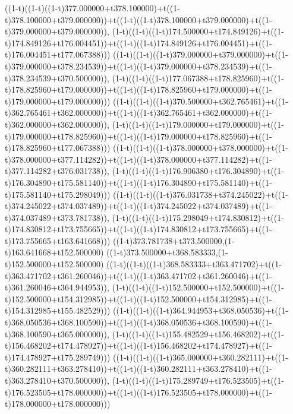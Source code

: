 ((1-t)((1-t)((1-t)377.000000+t378.100000)+t((1-t)378.100000+t379.000000))+t((1-t)((1-t)378.100000+t379.000000)+t((1-t)379.000000+t379.000000)),                                     (1-t)((1-t)((1-t)174.500000+t174.849126)+t((1-t)174.849126+t176.004451))+t((1-t)((1-t)174.849126+t176.004451)+t((1-t)176.004451+t177.067388)))
((1-t)((1-t)((1-t)379.000000+t379.000000)+t((1-t)379.000000+t378.234539))+t((1-t)((1-t)379.000000+t378.234539)+t((1-t)378.234539+t370.500000)),                                     (1-t)((1-t)((1-t)177.067388+t178.825960)+t((1-t)178.825960+t179.000000))+t((1-t)((1-t)178.825960+t179.000000)+t((1-t)179.000000+t179.000000)))
((1-t)((1-t)((1-t)370.500000+t362.765461)+t((1-t)362.765461+t362.000000))+t((1-t)((1-t)362.765461+t362.000000)+t((1-t)362.000000+t362.000000)),                                     (1-t)((1-t)((1-t)179.000000+t179.000000)+t((1-t)179.000000+t178.825960))+t((1-t)((1-t)179.000000+t178.825960)+t((1-t)178.825960+t177.067388)))
((1-t)((1-t)((1-t)378.000000+t378.000000)+t((1-t)378.000000+t377.114282))+t((1-t)((1-t)378.000000+t377.114282)+t((1-t)377.114282+t376.031738)),                                     (1-t)((1-t)((1-t)176.906380+t176.304890)+t((1-t)176.304890+t175.581140))+t((1-t)((1-t)176.304890+t175.581140)+t((1-t)175.581140+t175.298049)))
((1-t)((1-t)((1-t)376.031738+t374.245022)+t((1-t)374.245022+t374.037489))+t((1-t)((1-t)374.245022+t374.037489)+t((1-t)374.037489+t373.781738)),                                     (1-t)((1-t)((1-t)175.298049+t174.830812)+t((1-t)174.830812+t173.755665))+t((1-t)((1-t)174.830812+t173.755665)+t((1-t)173.755665+t163.641668)))
((1-t)373.781738+t373.500000,(1-t)163.641668+t152.500000)
((1-t)373.500000+t368.583333,(1-t)152.500000+t152.500000)
((1-t)((1-t)((1-t)368.583333+t363.471702)+t((1-t)363.471702+t361.260046))+t((1-t)((1-t)363.471702+t361.260046)+t((1-t)361.260046+t364.944953)),                                     (1-t)((1-t)((1-t)152.500000+t152.500000)+t((1-t)152.500000+t154.312985))+t((1-t)((1-t)152.500000+t154.312985)+t((1-t)154.312985+t155.482529)))
((1-t)((1-t)((1-t)364.944953+t368.050536)+t((1-t)368.050536+t368.100590))+t((1-t)((1-t)368.050536+t368.100590)+t((1-t)368.100590+t365.000000)),                                     (1-t)((1-t)((1-t)155.482529+t156.468202)+t((1-t)156.468202+t174.478927))+t((1-t)((1-t)156.468202+t174.478927)+t((1-t)174.478927+t175.289749)))
((1-t)((1-t)((1-t)365.000000+t360.282111)+t((1-t)360.282111+t363.278410))+t((1-t)((1-t)360.282111+t363.278410)+t((1-t)363.278410+t370.500000)),                                     (1-t)((1-t)((1-t)175.289749+t176.523505)+t((1-t)176.523505+t178.000000))+t((1-t)((1-t)176.523505+t178.000000)+t((1-t)178.000000+t178.000000)))
